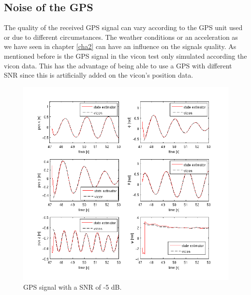 \FloatBarrier

\subsection{Noise of the GPS}\label{noise}
The quality of the received GPS signal can vary according to the GPS unit used or due to different circumstances. The weather conditions or  an acceleration as we have seen in chapter \ref{cha2} can have an influence on the signals quality. As mentioned before is the GPS signal in the vicon test only simulated according the vicon data. This has the advantage of being able to use a GPS with different SNR since this is artificially added on the vicon's position data.
\begin{figure}[hb]
\centering
\includegraphics[width=1\textwidth]{pictures/2_2_SNR5_detail_GPS.png}
\caption{GPS signal with a SNR of -5 dB.}
\label{detail_5snr}
\end{figure}
